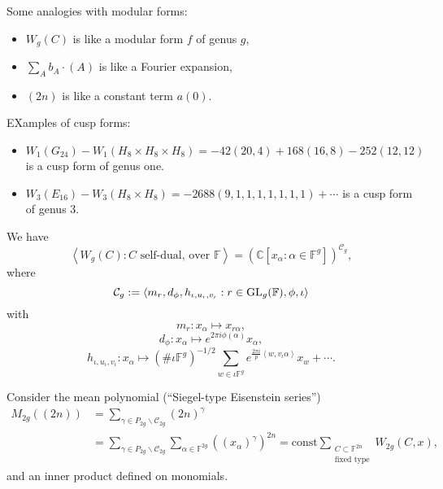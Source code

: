 \documentclass[reqno]{amsart} 
\begin{document}
Some analogies with modular forms:
\begin{itemize}
\item $W_g(C)$ is like a modular form $f$ of genus $g$,
\item $\sum_A b_A \cdot(A)$ is like a Fourier expansion,
\item $(2 n)$ is like a constant term $a(0)$.
\end{itemize}
EXamples of cusp forms:
\begin{itemize}
\item $W_1(G_{24}) - W_1(H_8 \times H_8 \times H_8)
  = - 42(20, 4) + 168(16, 8) - 252(12, 12)$ is a cusp form of genus one.
\item $W_3(E_{16}) - W_3(H_8 \times H_8) = - 2688(9, 1, 1, 1, 1, 1, 1, 1) + \dotsb$ is a cusp form of genus $3$.
\end{itemize}

\begin{theorem}
  We have
  \begin{equation*}
    \left\langle W_g(C) : \text{$C$ self-dual, over $\mathbb{F}$} \right\rangle
    =
    \left( \mathbb{C}[x_\alpha : \alpha \in \mathbb{F}^g] \right)^{\mathcal{C}_g},
  \end{equation*}
  where
  \begin{equation*}
    \mathcal{C}_g := \left\langle m_r, d_\phi, h_{\iota, u_{\iota}, v_{\iota}} : r \in \operatorname{GL}_g(\mathbb{F}), \phi, \iota \right\rangle
  \end{equation*}
  with
  \begin{equation*}
    m_r : x_\alpha \mapsto x_{r \alpha},
  \end{equation*}
  \begin{equation*}
    d_\phi : x_\alpha \mapsto e^{2 \pi i \phi(\alpha)} x_\alpha,
  \end{equation*}
  \begin{equation*}
    h_{\iota, u_\iota, v_\iota}
    : x_\alpha \mapsto \left( \# \iota \mathbb{F}^g \right)^{- 1/2}
    \sum_{w \in \iota \mathbb{F}^g}
    e^{\frac{2 \pi i}{p} \left\langle w, v_\iota \alpha \right\rangle} x_w + \dotsb.
  \end{equation*}
\end{theorem}
Consider the mean polynomial (``Siegel-type Eisenstein series'')
\begin{align*}
  M_{2 g}((2 n)) &= \sum_{\gamma \in P_{2 g} \backslash \mathcal{C}_{2 g}}
  (2 n)^\gamma
  \\
  &=
  \sum_{\gamma \in P_{2 g} \backslash \mathcal{C}_{2 g}} \sum_{\alpha \in \mathbb{F}^{2 g}}
  \left((x_\alpha)^\gamma \right)^{2 n}
  = \mathrm{const} \sum_{
    \substack{
      C \subset \mathbb{F}^{2 n}  \\
      \text{fixed type}      
    }
  }
  W_{2 g}(C, x),
\end{align*}
and an inner product defined on monomials.
\end{document}
